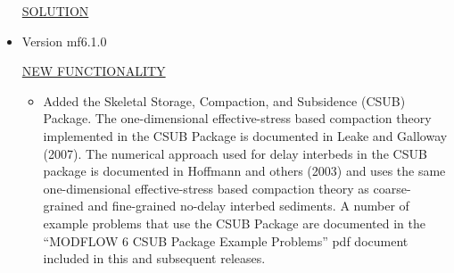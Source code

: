 \documentclass[11pt,twoside,twocolumn]{usgsreport}
\begin{document}
\begin{itemize}
\underline{SOLUTION}

\item Version mf6.1.0

\underline{NEW FUNCTIONALITY}
\begin{itemize}
	\item Added the Skeletal Storage, Compaction, and Subsidence (CSUB) Package. The one-dimensional effective-stress based compaction theory implemented in the CSUB Package is documented in Leake and Galloway (2007). The numerical approach used for delay interbeds in the CSUB package is documented in Hoffmann and others (2003) and uses the same one-dimensional effective-stress based compaction theory as coarse-grained and fine-grained no-delay interbed sediments. A number of example problems that use the CSUB Package are documented in the ``MODFLOW 6 CSUB Package Example Problems'' pdf document included in this and subsequent releases.
\end{itemize}


\end{itemize}
\end{document}
